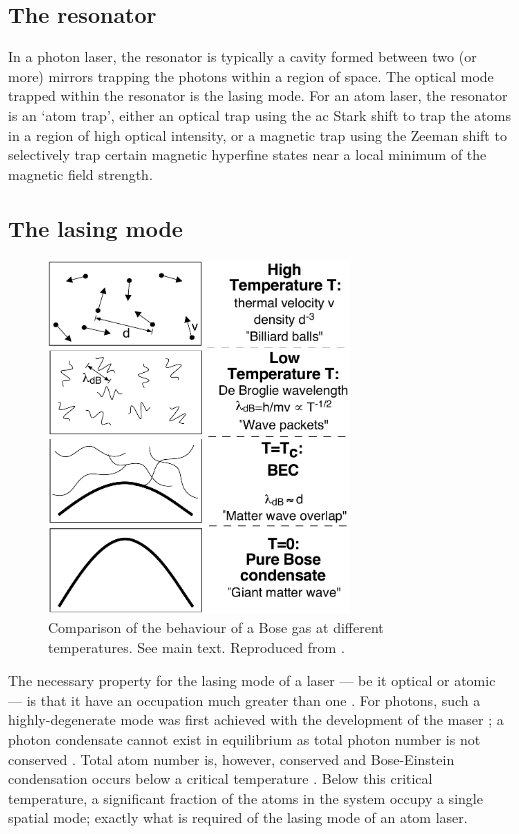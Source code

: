 \subsection{The resonator}

In a photon laser, the resonator is typically a cavity formed between two (or more) mirrors trapping the photons within a region of space.  The optical mode trapped within the resonator is the lasing mode.  For an atom laser, the resonator is an `atom trap', either an optical trap using the ac Stark shift to trap the atoms in a region of high optical intensity, or a magnetic trap using the Zeeman shift to selectively trap certain magnetic hyperfine states near a local minimum of the magnetic field strength.

\subsection{The lasing mode}

\begin{figure}
    \centering
    \includegraphics[width=8cm]{WhatIsBEC}
    \caption{
        \label{Introduction:WhatIsBEC}
        Comparison of the behaviour of a Bose gas at different temperatures.  See main text.  Reproduced from \citet{Ketterle:1999fk}.
    }
\end{figure}

The necessary property for the lasing mode of a laser --- be it optical or atomic --- is that it have an occupation much greater than one \citep{Wiseman:1997ba}.  For photons, such a highly-degenerate mode was first achieved with the development of the maser \citep{Gordon:1955}; a photon condensate cannot exist in equilibrium as total photon number is not conserved \citep{Muller:1986,Ketterle:1999fk}.  Total atom number is, however, conserved and Bose-Einstein condensation occurs below a critical temperature \citep{PethickSmith}.  Below this critical temperature, a significant fraction of the atoms in the system occupy a single spatial mode; exactly what is required of the lasing mode of an atom laser.

